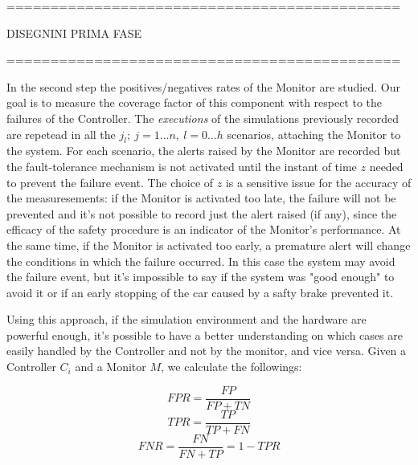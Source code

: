 =============================================

DISEGNINI PRIMA FASE

=============================================

In the second step the positives/negatives rates of the Monitor are studied. Our goal is to measure the coverage factor of this component with respect to the failures of the Controller.\newline
The \textsl{executions} of the simulations previously recorded are repetead in all the $j_{l}; \: j=1\dots n, \: l=0\dots h$ scenarios, attaching the Monitor to the system. For each scenario, the alerts raised by the Monitor are recorded but the fault-tolerance mechanism is not activated until the instant of time $z$ needed to prevent the failure event. The choice of $z$ is a sensitive issue for the accuracy of the measuresements: if the Monitor is activated too late, the failure will not be prevented and it's not possible to record just the alert raised (if any), since the efficacy of the safety procedure is an indicator of the Monitor's performance. At the same time, if the Monitor is activated too early, a premature alert will change the conditions in which the failure occurred. In this case the system may avoid the failure event, but it's impossible to say if the system was "good enough" to avoid it or if an early stopping of the car caused by a safty brake prevented it.

Using this approach, if the simulation environment and the hardware are powerful enough, it's possible to have a better understanding on which cases are easily handled by the Controller and not by the monitor, and vice versa.
Given a Controller $C_{i}$ and a Monitor $M$, we calculate the followings:

\begin{equation}
	FPR = \frac{FP}{FP+TN}
\end{equation}
\begin{equation}
	TPR = \frac{TP}{TP+FN}
\end{equation}
\begin{equation}
	FNR = \frac{FN}{FN+TP} = 1 - TPR
\end{equation}

